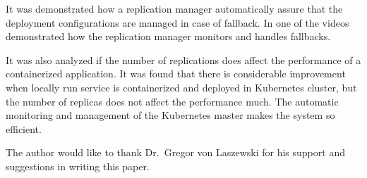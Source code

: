 It was demonstrated how a replication manager automatically assure that the
deployment configurations are managed in case of fallback. In one of the
videos demonstrated how the replication manager monitors and handles
fallbacks.

It was also analyzed if the number of replications does affect the performance
of a containerized application. It was found that there is considerable
improvement when locally run service is containerized and deployed in
Kubernetes cluster, but the number of replicas does not affect the performance
much. The automatic monitoring and management of the Kubernetes master makes
the system so efficient.
\begin{acks}
The author would like to thank Dr.\ Gregor von Laszewski for his support and
suggestions in writing this paper.
\end{acks}





